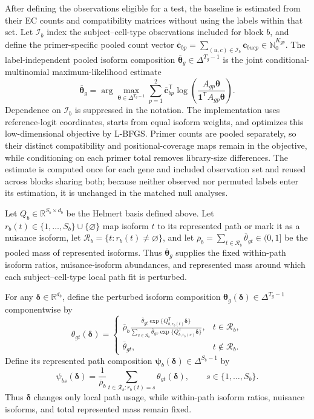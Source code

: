 \documentclass[11pt]{article}
\begin{document}
After defining the observations eligible for a test, the baseline is estimated from their EC counts and compatibility matrices without using the labels within that set. Let \(\mathcal I_b\) index the subject--cell-type observations included for block \(b\), and define the primer-specific pooled count vector \(\overline{\bm c}_{bp}=\sum_{(u,c)\in\mathcal I_b}\bm c_{bucp}\in\mathbb N_0^{K_{gp}}\). The label-independent pooled isoform composition \(\overline{\bm\theta}_g\in\Delta^{T_g-1}\) is the joint conditional-multinomial maximum-likelihood estimate \[\overline{\bm\theta}_g=\arg\max_{\bm\theta\in\Delta^{T_g-1}}\sum_{p=1}^2\overline{\bm c}_{bp}^{\mathsf T}\log\left(\frac{A_{gp}\bm\theta}{\bm1^{\mathsf T}A_{gp}\bm\theta}\right).\] Dependence on \(\mathcal I_b\) is suppressed in the notation. The implementation uses reference-logit coordinates, starts from equal isoform weights, and optimizes this low-dimensional objective by L-BFGS. Primer counts are pooled separately, so their distinct compatibility and positional-coverage maps remain in the objective, while conditioning on each primer total removes library-size differences. The estimate is computed once for each gene and included observation set and reused across blocks sharing both; because neither observed nor permuted labels enter its estimation, it is unchanged in the matched null analyses.

Let \(Q_b\in\mathbb R^{S_b\times d_b}\) be the Helmert basis defined above. Let \(r_b(t)\in\{1,\ldots,S_b\}\cup\{\varnothing\}\) map isoform \(t\) to its represented path or mark it as a nuisance isoform, let \(\mathcal R_b=\{t:r_b(t)\ne\varnothing\}\), and let \(\overline\rho_b=\sum_{t\in\mathcal R_b}\overline\theta_{gt}\in(0,1]\) be the pooled mass of represented isoforms. Thus \(\overline{\bm\theta}_g\) supplies the fixed within-path isoform ratios, nuisance-isoform abundances, and represented mass around which each subject--cell-type local path fit is perturbed.

For any \(\bm\delta\in\mathbb R^{d_b}\), define the perturbed isoform composition \(\bm\theta_g(\bm\delta)\in\Delta^{T_g-1}\) componentwise by \[\theta_{gt}(\bm\delta)=\begin{cases}\displaystyle \overline\rho_b\frac{\overline\theta_{gt}\exp\{Q_{b,r_b(t)}^{\mathsf T}\bm\delta\}}{\sum_{v\in\mathcal R_b}\overline\theta_{gv}\exp\{Q_{b,r_b(v)}^{\mathsf T}\bm\delta\}},&t\in\mathcal R_b,\\ \overline\theta_{gt},&t\notin\mathcal R_b.\end{cases}\] Define its represented path composition \(\bm\psi_b(\bm\delta)\in\Delta^{S_b-1}\) by \[\psi_{bs}(\bm\delta)=\frac{1}{\overline\rho_b}\sum_{t\in\mathcal R_b:r_b(t)=s}\theta_{gt}(\bm\delta),\qquad s\in\{1,\ldots,S_b\}.\] Thus \(\bm\delta\) changes only local path usage, while within-path isoform ratios, nuisance isoforms, and total represented mass remain fixed.
\end{document}
